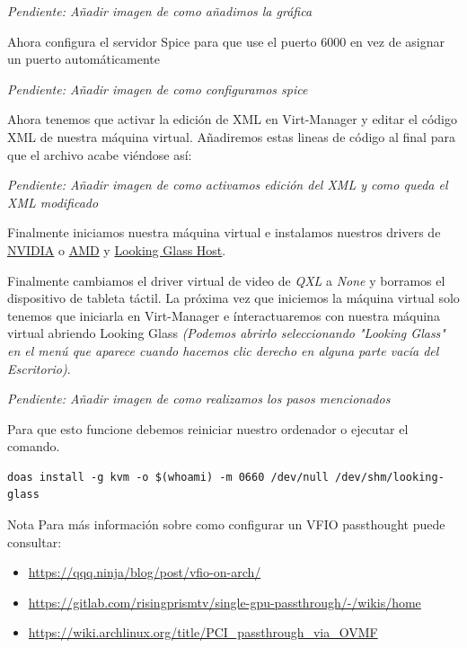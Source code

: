 \documentclass[12pt]{article}
\begin{document}
\emph{Pendiente: Añadir imagen de como añadimos la gráfica}

Ahora configura el servidor Spice para que use el puerto 6000 en vez de asignar un puerto automáticamente

\emph{Pendiente: Añadir imagen de como configuramos spice}

Ahora tenemos que activar la edición de XML en Virt-Manager y editar el código XML de nuestra máquina virtual. Añadiremos estas lineas de código al final para que el archivo acabe viéndose así:

\emph{Pendiente: Añadir imagen de como activamos edición del XML y como queda el XML modificado}

Finalmente iniciamos nuestra máquina virtual e instalamos nuestros drivers de \href{https://www.nvidia.es/Download/index.aspx?lang=es}{NVIDIA} o \href{https://www.amd.com/es/support}{AMD} y \href{https://looking-glass.io/downloads}{Looking Glass Host}.

Finalmente cambiamos el driver virtual de video de \emph{QXL} a \emph{None} y borramos el dispositivo de tableta táctil. La próxima vez que iniciemos la máquina virtual solo tenemos que iniciarla en Virt-Manager e ínteractuaremos con nuestra máquina virtual abriendo Looking Glass \emph{(Podemos abrirlo seleccionando "Looking Glass" en el menú que aparece cuando hacemos clic derecho en alguna parte vacía del Escritorio)}.

\emph{Pendiente: Añadir imagen de como realizamos los pasos mencionados}

Para que esto funcione debemos reiniciar nuestro ordenador o ejecutar el comando.

\begin{verbatim}
doas install -g kvm -o $(whoami) -m 0660 /dev/null /dev/shm/looking-glass
\end{verbatim}

\begin{mybox}{Nota}
	Para más información sobre como configurar un VFIO passthought puede consultar:
	\begin{itemize}
		\setlength\itemsep{0em}
		\item \href{https://qqq.ninja/blog/post/vfio-on-arch/}{https://qqq.ninja/blog/post/vfio-on-arch/}
		\item \href{https://gitlab.com/risingprismtv/single-gpu-passthrough/-/wikis/home}{https://gitlab.com/risingprismtv/single-gpu-passthrough/-/wikis/home}
		\item \href{https://wiki.archlinux.org/title/PCI\_passthrough\_via\_OVMF}{https://wiki.archlinux.org/title/PCI\_passthrough\_via\_OVMF}
	\end{itemize}
\end{mybox}
\end{document}
